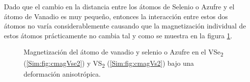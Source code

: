 \par Dado que el cambio en la distancia entre los \'atomos de Selenio o Azufre  y el \'atomo de Vanadio es muy peque\~no, entonces la interacci\'on entre estos dos \'atomos no var\'ia considerablemente causando que la magnetizaci\'on individual de estos \'atomos pr\'acticamente no cambia tal y como se muestra en la figura \ref{Sim:fig:cmagVX2}. 
\begin{figure}[!hbt]
	\centering
	\caption[Magnetizaci\'on de los \'atomos individuales en el VS\textsubscript{2} y VSe\textsubscript{2} bajo una deformaci\'on anisotr\'opica]{Magnetizaci\'on del \'atomo de vanadio y selenio o Azufre en el VSe\textsubscript{2} (\ref{Sim:fig:cmagVse2}) y VS\textsubscript{2} (\ref{Sim:fig:cmagVs2}) bajo una deformaci\'on anisotr\'opica.}
	\label{Sim:fig:cmagVX2}
\end{figure}
